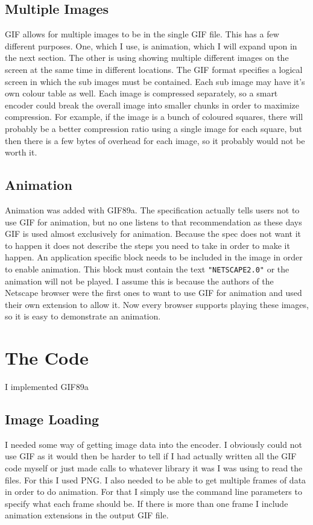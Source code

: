 \documentclass[11pt]{article} %
\begin{document}
\subsection{Multiple Images}
GIF allows for multiple images to be in the single GIF file. This has a few different purposes. One, which I use, is animation, which I will expand upon in the next section. The other is using showing multiple different images on the screen at the same time in different locations. The GIF format specifies a logical screen in which the sub images must be contained. Each sub image may have it's own colour table as well. Each image is compressed separately, so a smart encoder could break the overall image into smaller chunks in order to maximize compression. For example, if the image is a bunch of coloured squares, there will probably be a better compression ratio using a single image for each square, but then there is a few bytes of overhead for each image, so it probably would not be worth it. 
\subsection{Animation}
Animation was added with GIF89a. The specification actually tells users not to use GIF for animation, but no one listens to that recommendation as these days GIF is used almost exclusively for animation. Because the spec does not want it to happen it does not describe the steps you need to take in order to make it happen. An application specific block needs to be included in the image in order to enable animation. This block must contain the text \texttt{"NETSCAPE2.0"} or the animation will not be played. I assume this is because the authors of the Netscape browser were the first ones to want to use GIF for animation and used their own extension to allow it. Now every browser supports playing these images, so it is easy to demonstrate an animation. 
\section{The Code}
I implemented GIF89a
\subsection{Image Loading}
I needed some way of getting image data into the encoder. I obviously could not use GIF as it would then be harder to tell if I had actually written all the GIF code myself or just made calls to whatever library it was I was using to read the files. For this I used PNG.
I also needed to be able to get multiple frames of data in order to do animation. For that I simply use the command line parameters to specify what each frame should be. If there is more than one frame I include animation extensions in the output GIF file.
\end{document}
